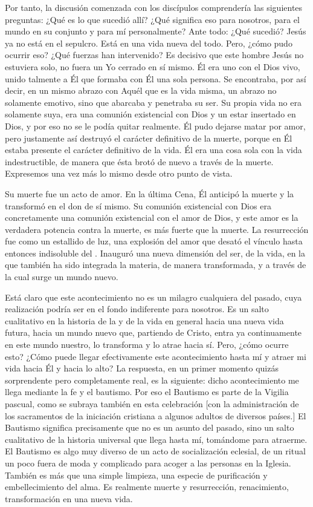 \begin{body}
Por tanto, la discusión comenzada con los discípulos comprendería las siguientes preguntas: ¿Qué es lo que sucedió allí? ¿Qué significa eso para nosotros, para el mundo en su conjunto y para mí personalmente? Ante todo: ¿Qué sucedió? Jesús ya no está en el sepulcro. Está en una vida nueva del todo. Pero, ¿cómo pudo ocurrir eso? ¿Qué fuerzas han intervenido? Es decisivo que este hombre Jesús no estuviera solo, no fuera un Yo cerrado en sí mismo. Él era uno con el Dios vivo, unido talmente a Él que formaba con Él una sola persona. Se encontraba, por así decir, en un mismo abrazo con Aquél que es la vida misma, un abrazo no solamente emotivo, sino que abarcaba y penetraba su ser. Su propia vida no era solamente suya, era una comunión existencial con Dios y un estar insertado en Dios, y por eso no se le podía quitar realmente. Él pudo dejarse matar por amor, pero justamente así destruyó el carácter definitivo de la muerte, porque en Él estaba presente el carácter definitivo de la vida. Él era una cosa sola con la vida indestructible, de manera que ésta brotó de nuevo a través de la muerte. Expresemos una vez más lo mismo desde otro punto de vista.

Su muerte fue un acto de amor. En la última Cena, Él anticipó la muerte y la transformó en el don de sí mismo. Su comunión existencial con Dios era concretamente una comunión existencial con el amor de Dios, y este amor es la verdadera potencia contra la muerte, es más fuerte que la muerte. La resurrección fue como un estallido de luz, una explosión del amor que desató el vínculo hasta entonces indisoluble del . Inauguró una nueva dimensión del ser, de la vida, en la que también ha sido integrada la materia, de manera transformada, y a través de la cual surge un mundo nuevo.

Está claro que este acontecimiento no es un milagro cualquiera del pasado, cuya realización podría ser en el fondo indiferente para nosotros. Es un salto cualitativo en la historia de la  y de la vida en general hacia una nueva vida futura, hacia un mundo nuevo que, partiendo de Cristo, entra ya continuamente en este mundo nuestro, lo transforma y lo atrae hacia sí. Pero, ¿cómo ocurre esto? ¿Cómo puede llegar efectivamente este acontecimiento hasta mí y atraer mi vida hacia Él y hacia lo alto? La respuesta, en un primer momento quizás sorprendente pero completamente real, es la siguiente: dicho acontecimiento me llega mediante la fe y el bautismo. Por eso el Bautismo es parte de la Vigilia pascual, como se subraya también en esta celebración [con la administración de los sacramentos de la iniciación cristiana a algunos adultos de diversos países.] El Bautismo significa precisamente que no es un asunto del pasado, sino un salto cualitativo de la historia universal que llega hasta mí, tomándome para atraerme. El Bautismo es algo muy diverso de un acto de socialización eclesial, de un ritual un poco fuera de moda y complicado para acoger a las personas en la Iglesia. También es más que una simple limpieza, una especie de purificación y embellecimiento del alma. Es realmente muerte y resurrección, renacimiento, transformación en una nueva vida.


\end{body}
